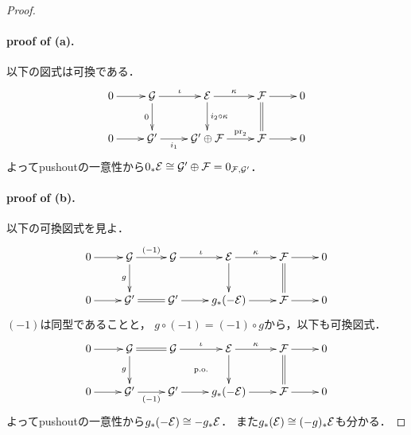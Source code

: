 \documentclass[a4paper]{jsarticle}
\makeatletter
\newcommand{\centerpo}{\ar@{}[lu]|{\text{p.o.}}}
\makeatother
\begin{document}
    \begin{proof}
        \paragraph{proof of (a).}
        以下の図式は可換である．
        \[\xymatrix{
            0 \ar[r] & \shG \ar[d]_-{0}\ar[r]^{\iota}&
                    \shE \ar[r]^-{\kappa}\ar[d]^-{i_2 \circ \kappa}& \shF \ar[r]\ar@{=}[d]& 0 \\ 
            0 \ar[r]& \shG' \ar[r]_-{i_1}& \shG' \oplus \shF \ar[r]^-{\pr_2}& \shF \ar[r]& 0
        }\]
        よってpushoutの一意性から$0_*\mathcal{E} \cong \mathcal{G}' \oplus \mathcal{F}=0_{\mathcal{F}, \mathcal{G}'}$．

        \paragraph{proof of (b).}
        以下の可換図式を見よ．
        \[\xymatrix{
            0 \ar[r]& \shG \ar[r]^{(-1)}\ar[d]_-{g}& \shG \ar[r]^{\iota}& \shE \ar[r]^-{\kappa}\ar[d]& \shF \ar[r]\ar@{=}[d]& 0 \\ 
            0 \ar[r]& \shG' \ar@{=}[r]& \shG' \ar[r]& g_*(-\shE) \ar[r]& \shF \ar[r]& 0 \\ 
        }\]
        $(-1)$は同型であることと，
        $g \circ (-1)=(-1) \circ g$から，以下も可換図式．
        \[\vcenter{\xymatrix{
            0 \ar[r]& \shG \ar@{=}[r]\ar[d]_-{g}& \shG \ar[r]^{\iota}& \shE \ar[r]^-{\kappa}\ar[d]& \shF \ar[r]\ar@{=}[d]& 0 \\ 
            0 \ar[r]& \shG' \ar[r]_-{(-1)}& \shG' \ar[r]& g_*(-\shE) \centerpo\ar[r]& \shF \ar[r]& 0 \\ 
        }}\]
        よってpushoutの一意性から$g_*(-\mathcal{E}) \cong -g_*\mathcal{E}$．
        また$g_*(\mathcal{E}) \cong (-g)_* \mathcal{E}$も分かる．


\end{proof}
\end{document}
